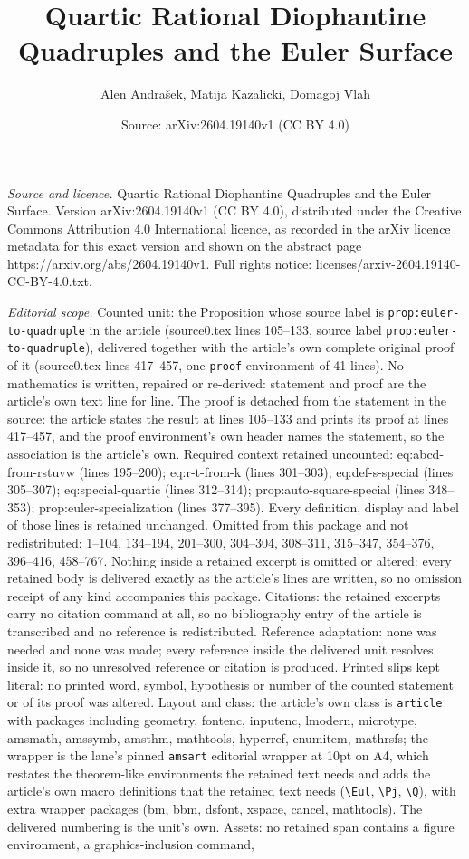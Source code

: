 \documentclass[10pt,a4paper]{amsart}
\title[Quartic Rational Diophantine Quadruples and the Euler Surfac]{Quartic Rational Diophantine Quadruples and the Euler Surface}
\author{Alen Andra\v{s}ek, Matija Kazalicki, Domagoj Vlah}
\date{Source: arXiv:2604.19140v1 (CC BY 4.0)}
\begin{document}
\maketitle

\noindent\emph{Source and licence.} Quartic Rational Diophantine Quadruples and the Euler Surface. Version arXiv:2604.19140v1 (CC BY 4.0), distributed under the Creative Commons Attribution 4.0 International licence, as recorded in the arXiv licence metadata for this exact version and shown on the abstract page https://arxiv.org/abs/2604.19140v1. Full rights notice: licenses/arxiv-2604.19140-CC-BY-4.0.txt.\par\smallskip

\noindent\textit{Editorial scope.} Counted unit: the Proposition whose source label is \texttt{prop:euler-to-quadruple} in the article (source0.tex lines 105--133, source label \texttt{prop:euler-to-quadruple}), delivered together with the article's own complete original proof of it (source0.tex lines 417--457, one \texttt{proof} environment of 41 lines). No mathematics is written, repaired or re-derived: statement and proof are the article's own text line for line. The proof is detached from the statement in the source: the article states the result at lines 105--133 and prints its proof at lines 417--457, and the proof environment's own header names the statement, so the association is the article's own. Required context retained uncounted: eq:abcd-from-rstuvw (lines 195--200); eq:r-t-from-k (lines 301--303); eq:def-s-special (lines 305--307); eq:special-quartic (lines 312--314); prop:auto-square-special (lines 348--353); prop:euler-specialization (lines 377--395). Every definition, display and label of those lines is retained unchanged. Omitted from this package and not redistributed: 1--104, 134--194, 201--300, 304--304, 308--311, 315--347, 354--376, 396--416, 458--767. Nothing inside a retained excerpt is omitted or altered: every retained body is delivered exactly as the article's lines are written, so no omission receipt of any kind accompanies this package. Citations: the retained excerpts carry no citation command at all, so no bibliography entry of the article is transcribed and no reference is redistributed. Reference adaptation: none was needed and none was made; every reference inside the delivered unit resolves inside it, so no unresolved reference or citation is produced. Printed slips kept literal: no printed word, symbol, hypothesis or number of the counted statement or of its proof was altered. Layout and class: the article's own class is \texttt{article} with packages including geometry, fontenc, inputenc, lmodern, microtype, amsmath, amssymb, amsthm, mathtools, hyperref, enumitem, mathrsfs; the wrapper is the lane's pinned \texttt{amsart} editorial wrapper at 10pt on A4, which restates the theorem-like environments the retained text needs and adds the article's own macro definitions that the retained text needs (\texttt{\textbackslash Eul}, \texttt{\textbackslash Pj}, \texttt{\textbackslash Q}), with extra wrapper packages (bm, bbm, dsfont, xspace, cancel, mathtools). The delivered numbering is the unit's own. Assets: no retained span contains a figure environment, a graphics-inclusion command, 
\end{document}
